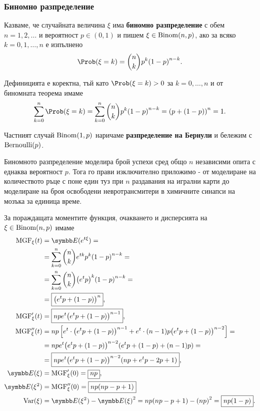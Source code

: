 \documentclass[numbers=endperiod, bibliography=totocnumbered]{scrartcl}
\begin{document}
\subsubsection{Биномно разпределение}\label{dist:binomial}

\begin{definition}
  Казваме, че случайната величина \( \xi \) има \textbf{биномно разпределение} с обем \( n = 1, 2, \ldots \) и вероятност \( p \in (0, 1) \) и пишем \( \xi \in \operatorname{Binom}(n, p) \), ако за всяко \( k = 0, 1, \ldots, n \) е изпълнено
  \begin{equation*}
    \Prob(\xi = k) = \binom{n}{k} p^k {(1-p)}^{n-k}.
  \end{equation*}

  Дефиницията е коректна, тъй като \( \Prob(\xi = k) > 0 \) за \( k = 0, \ldots, n \) и от биномната теорема имаме
  \begin{equation*}
    \sum_{k=0}^n \Prob(\xi = k)
    =
    \sum_{k=0}^n \binom{n}{k} p^k {(1-p)}^{n-k}
    =
    {(p+(1-p))}^n = 1.
  \end{equation*}

  Частният случай \( \operatorname{Binom}(1, p) \) наричаме \textbf{разпределение на Бернули} и бележим с \( \operatorname{Bernoulli}(p) \).
\end{definition}

Биномното разпределение моделира брой успехи сред общо \( n \) независими опита с еднаква вероятност \( p \). Тога го прави изключително приложимо - от моделиране на количеството ръце с поне един туз при \( n \) раздавания на игрални карти до моделиране на броя освободени невротрансмитери в химичните синапси на мозъка за единица време.

За пораждащата моментите функция, очакването и дисперсията на \( \xi \in \operatorname{Binom}(n, p) \) имаме
\begingroup
\allowdisplaybreaks
\begin{align*}
  \MGF_\xi(t)
  &=
  \Expect(e^{t\xi})
  = \\ &=
  \sum_{k=0}^n \binom{n}{k} e^{tk} p^k {(1-p)}^{n-k}
  = \\ &=
  \sum_{k=0}^n \binom{n}{k} {\left( e^t p \right)}^k {(1-p)}^{n-k}
  = \\ &=
  \boxed{{\left( e^t p + (1-p) \right)}^n},
  \\
  \MGF'_\xi(t)
  &=
  \boxed{n p e^t {\left( e^t p + (1-p) \right)}^{n-1}},
  \\
  \MGF''_\xi(t)
  &=
  n p \left[ e^t \cdot {\left( e^t p + (1-p) \right)}^{n-1} + e^t \cdot (n-1) p {\left( e^t p + (1-p) \right)}^{n-2} \right]
  = \\ &=
  n p e^t {\left( e^t p + (1-p) \right)}^{n-2} (e^t p + (1-p) + (n-1)p)
  = \\ &=
  \boxed{n p e^t {\left( e^t p + (1-p) \right)}^{n-2} (np + e^t p - 2p + 1)},
  \\
  \Expect(\xi)
  &=
  \MGF'_\xi(0)
  =
  \boxed{np},
  \\
  \Expect(\xi^2)
  &=
  \MGF''_\xi(0)
  =
  \boxed{np(np - p + 1)}
  \\
  \Var(\xi)
  &=
  \Expect(\xi^2) - {\Expect(\xi)}^2
  =
  np(np - p + 1) - {(np)}^2
  =
  \boxed{np(1 - p)}.
\end{align*}
\endgroup
\end{document}
